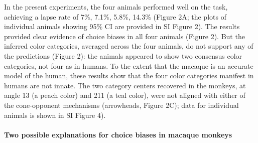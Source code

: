 In the present experiments, the four animals performed well on the task, achieving a lapse rate of 7\%, 7.1\%, 5.8\%, 14.3\% (Figure 2A; the plots of individual animals showing 95\% CI are provided in SI Figure 2).
The results provided clear evidence of choice biases in all four animals (Figure 2).
But the inferred color categories, averaged across the four animals, do not support any of the predictions (Figure 2): the animals appeared to show two consensus color categories, not four as in humans. 
To the extent that the macaque is an accurate model of the human, these results show that the four color categories manifest in humans are not innate. 
The two category centers recovered in the monkeys, at angle 13 (a peach color) and 211 (a teal color), were not aligned with either of the cone-opponent mechanisms (arrowheads, Figure 2C); data for individual animals is shown in SI Figure 4).

\paragraph{Two possible explanations for choice biases in macaque monkeys}

